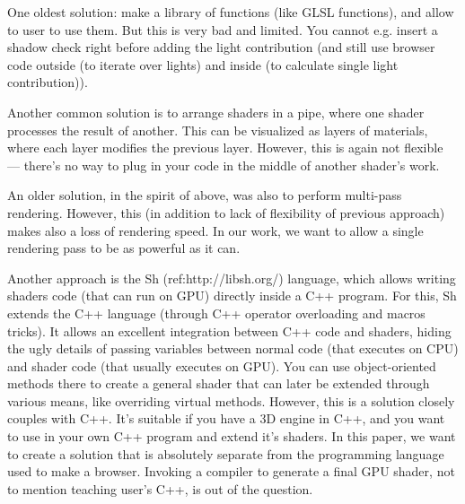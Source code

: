\documentclass{acmsiggraph}                     %
\begin{document}
One oldest solution: make a library of functions (like GLSL
functions), and allow to user to use them. But this is very bad and
limited. You cannot e.g. insert a shadow check right before adding the
light contribution (and still use browser code outside (to iterate
over lights) and inside (to calculate single light contribution)).

Another common solution is to arrange shaders in a pipe, where one
shader processes the result of another. This can be visualized as
layers of materials, where each layer modifies the previous
layer. However, this is again not flexible --- there's no way to plug
in your code in the middle of another shader's work.

An older solution, in the spirit of above, was also to perform
multi-pass rendering. However, this (in addition to lack of
flexibility of previous approach) makes also a loss of rendering
speed. In our work, we want to allow a single rendering pass to be as
powerful as it can.


Another approach is the Sh (ref:http://libsh.org/) language, which
allows writing shaders code (that can run on GPU) directly inside a
C++ program. For this, Sh extends the C++ language (through C++
operator overloading and macros tricks). It allows an excellent
integration between C++ code and shaders, hiding the ugly details of
passing variables between normal code (that executes on CPU) and
shader code (that usually executes on GPU). You can use
object-oriented methods there to create a general shader that can
later be extended through various means, like overriding virtual
methods. However, this is a solution closely couples with C++. It's
suitable if you have a 3D engine in C++, and you want to use in your
own C++ program and extend it's shaders. In this paper, we want to
create a solution that is absolutely separate from the programming
language used to make a browser. Invoking a compiler to generate a
final GPU shader, not to mention teaching user's C++, is out of the
question.

\end{document}
